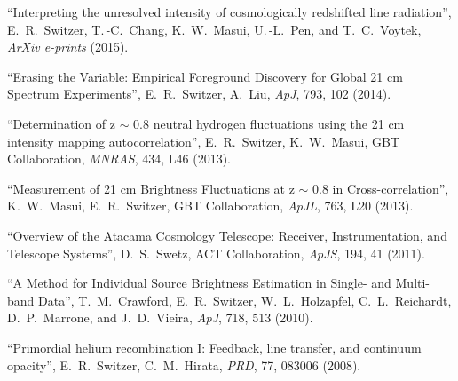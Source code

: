 \item ``Interpreting the unresolved intensity of cosmologically redshifted line radiation'', E.\, R.\, Switzer, T.\,-C.\, Chang, K.\, W.\, Masui, U.\,-L.\, Pen, and T.\, C.\, Voytek, {\it ArXiv e-prints} (2015).
\item ``Erasing the Variable: Empirical Foreground Discovery for Global 21 cm Spectrum Experiments'', E.\, R.\, Switzer, A.\, Liu, {\it ApJ}, 793, 102 (2014).
\item ``Determination of z $\sim$ 0.8 neutral hydrogen fluctuations using the 21 cm intensity mapping autocorrelation'', E.\, R.\, Switzer, K.\, W.\, Masui, GBT Collaboration, {\it MNRAS}, 434, L46 (2013).
\item ``Measurement of 21 cm Brightness Fluctuations at z $\sim$ 0.8 in Cross-correlation'', K.\, W.\, Masui, E.\, R.\, Switzer, GBT Collaboration, {\it ApJL}, 763, L20 (2013).
\item ``Overview of the Atacama Cosmology Telescope: Receiver, Instrumentation, and Telescope Systems'', D.\, S.\, Swetz, ACT Collaboration, {\it ApJS}, 194, 41 (2011).
\item ``A Method for Individual Source Brightness Estimation in Single- and Multi-band Data'', T.\, M.\, Crawford, E.\, R.\, Switzer, W.\, L.\, Holzapfel, C.\, L.\, Reichardt, D.\, P.\, Marrone, and J.\, D.\, Vieira, {\it ApJ}, 718, 513 (2010).
\item ``Primordial helium recombination I: Feedback, line transfer, and continuum opacity'', E.\, R.\, Switzer, C.\, M.\, Hirata, {\it PRD}, 77, 083006 (2008).
